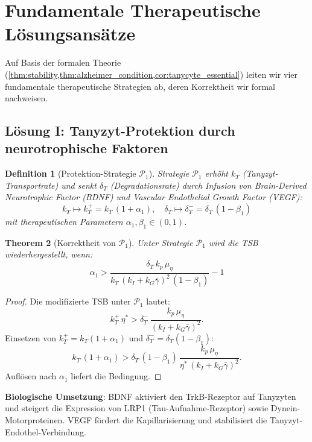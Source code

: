 ﻿\documentclass[12pt,a4paper]{article}
\newtheorem{theorem}{Theorem}[section]
\newtheorem{definition}[theorem]{Definition}
\theoremstyle{definition}
\begin{document}
	\section{Fundamentale Therapeutische Lösungsansätze}
	
	Auf Basis der formalen Theorie (\cref{thm:stability,thm:alzheimer_condition,cor:tanycyte_essential}) leiten wir vier fundamentale therapeutische Strategien ab, deren Korrektheit wir formal nachweisen.
	
	\subsection{Lösung I: Tanyzyt-Protektion durch neurotrophische Faktoren}
	
	\begin{definition}[Protektion-Strategie $\mathcal{P}_1$]
		Strategie $\mathcal{P}_1$ erhöht $k_T$ (Tanyzyt-Transportrate) und senkt $\delta_T$ (Degradationsrate) durch Infusion von Brain-Derived Neurotrophic Factor (BDNF) und Vascular Endothelial Growth Factor (VEGF):
		\[
		k_T \mapsto k_T^+ = k_T\,(1+\alpha_1), \quad \delta_T \mapsto \delta_T^- = \delta_T\,(1-\beta_1)
		\]
		mit therapeutischen Parametern $\alpha_1, \beta_1 \in (0,1)$.
	\end{definition}
	
	\begin{theorem}[Korrektheit von $\mathcal{P}_1$]
		\label{thm:p1_korrektheit}
		Unter Strategie $\mathcal{P}_1$ wird die TSB wiederhergestellt, wenn:
		\[
		\alpha_1 > \frac{\delta_T\,k_p\,\mu_\eta}{k_T\,(k_I + k_G\bar{\gamma})^2\,(1-\beta_1)} - 1
		\]
	\end{theorem}
	
	\begin{proof}
		Die modifizierte TSB unter $\mathcal{P}_1$ lautet:
		\[
		k_T^+\,\eta^* > \delta_T^-\,\frac{k_p\,\mu_\eta}{(k_I + k_G\bar{\gamma})^2}.
		\]
		Einsetzen von $k_T^+ = k_T(1+\alpha_1)$ und $\delta_T^- = \delta_T(1-\beta_1)$:
		\[
		k_T\,(1+\alpha_1) > \delta_T\,(1-\beta_1)\,\frac{k_p\,\mu_\eta}{\eta^*\,(k_I + k_G\bar{\gamma})^2}.
		\]
		Auflösen nach $\alpha_1$ liefert die Bedingung.
	\end{proof}
	
	\textbf{Biologische Umsetzung}: BDNF aktiviert den TrkB-Rezeptor auf Tanyzyten und steigert die Expression von LRP1 (Tau-Aufnahme-Rezeptor) sowie Dynein-Motorproteinen. VEGF fördert die Kapillarisierung und stabilisiert die Tanyzyt-Endothel-Verbindung.
	
\end{document}
